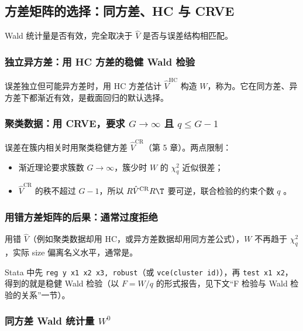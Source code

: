 \subsection{方差矩阵的选择：同方差、HC 与 CRVE}\label{sec:U06b-robustW}

Wald 统计量是否有效，完全取决于 $\hat V$ 是否与误差结构相匹配。

\subsubsection{独立异方差：用 HC 方差的稳健 Wald 检验}

误差独立但可能异方差时，用 HC 方差估计 $\hat V^{\mathrm{HC}}$ 构造 $W$，称为。它在同方差、异方差下都渐近有效，是截面回归的默认选择。

\subsubsection{聚类数据：用 CRVE，要求 \texorpdfstring{$G\to\infty$}{G to infinity} 且 \texorpdfstring{$q\le G-1$}{q <= G-1}}

误差在簇内相关时用聚类稳健方差 $\hat V^{\mathrm{CR}}$（第 5 章）。两点限制：
\begin{itemize}
  \item 渐近理论要求簇数 $G\to\infty$，簇少时 $W$ 的 $\chi^2_q$ 近似很差；
  \item $\hat V^{\mathrm{CR}}$ 的秩不超过 $G-1$，所以 $R\hat V^{\mathrm{CR}}R\T$ 要可逆，联合检验的约束个数 $q$ 。
\end{itemize}

\subsubsection{用错方差矩阵的后果：通常过度拒绝}

用错 $\hat V$（例如聚类数据却用 HC，或异方差数据却用同方差公式），$W$ 不再趋于 $\chi^2_q$，实际 size 偏离名义水平，通常是。

Stata 中先 \texttt{reg y x1 x2 x3, robust}（或 \texttt{vce(cluster id)}），再 \texttt{test x1 x2}，得到的就是稳健 Wald 检验（以 $F=W/q$ 的形式报告，见下文“F 检验与 Wald 检验的关系”一节）。

\subsubsection{同方差 Wald 统计量 \texorpdfstring{$W^0$}{W0}}

